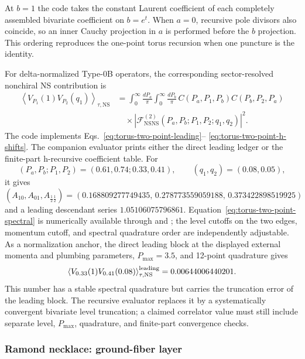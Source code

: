 \documentclass[11pt]{article}
\newcommand{\NS}{\mathrm{NS}}
\newcommand{\F}{\mathcal F}
\begin{document}
At $b=1$ the code takes the constant Laurent coefficient of each completely
assembled bivariate coefficient on $b=e^t$.  When $a=0$, recursive pole
divisors also coincide, so an inner Cauchy projection in $a$ is performed
before the $b$ projection.  This ordering reproduces the one-point torus
recursion when one puncture is the identity.

For delta-normalized Type-0B operators, the corresponding sector-resolved
nonchiral NS contribution is
\begin{equation}
\label{eq:torus-two-point-spectral}
\begin{aligned}
 \left\langle V_{P_1}(1)V_{P_2}(q_1)\right\rangle_{\tau,\NS}
 &=\int_0^\infty\frac{dP_a}{\pi}
  \int_0^\infty\frac{dP_b}{\pi}\,
 C(P_a,P_1,P_b)C(P_b,P_2,P_a)
 \\
 &\quad\times
 \left|\F_{\NS\NS}^{(2)}
 (P_a,P_b;P_1,P_2;q_1,q_2)\right|^2 .
\end{aligned}
\end{equation}
The code  implements
Eqs.~\eqref{eq:torus-two-point-leading}--
\eqref{eq:torus-two-point-h-shifts}.
The companion evaluator
 prints either the direct
leading ledger or the finite-part h-recursive coefficient table.
For
\[
 (P_a,P_b;P_1,P_2)=(0.61,0.74;0.33,0.41),
 \qquad (q_1,q_2)=(0.08,0.05),
\]
it gives
\[
 (A_{10},A_{01},A_{\frac12\frac12})
 =(0.168809277749435,\,
   0.278773559059188,\,
   0.373422898519925)
\]
and a leading descendant series $1.05106075796861$.
Equation~\eqref{eq:torus-two-point-spectral} is numerically available through
 and
; the level cutoffs on the
two edges, momentum cutoff, and spectral quadrature order are independently
adjustable.  As a normalization anchor, the direct leading block at the
displayed external momenta and plumbing parameters, $P_{\max}=3.5$, and
12-point quadrature gives
\[
 \left\langle V_{0.33}(1)V_{0.41}(0.08)\right\rangle_{\tau,\NS}^{\rm leading}
 =0.00644006440201.
\]
This number has a stable spectral quadrature but carries the truncation error
of the leading block.  The recursive evaluator replaces it by a systematically
convergent bivariate level truncation; a claimed correlator value must still
include separate level, $P_{\max}$, quadrature, and finite-part convergence
checks.

\subsubsection{Ramond necklace: ground-fiber layer}
\label{sec:torus-two-point-r-ground}
\end{document}
